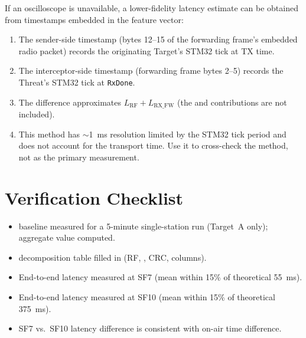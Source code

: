 \documentclass[11pt,letterpaper]{article}
\begin{document}
\begin{tcolorbox}[infobox={Timestamp Difference Method (Alternative)}]
	If an oscilloscope is unavailable, a lower-fidelity latency estimate can be obtained from timestamps embedded in the feature vector:
	\begin{enumerate}[leftmargin=1.2em]
		\item The sender-side timestamp (bytes 12--15 of the forwarding frame's embedded radio packet) records the originating Target's STM32 tick at TX time.
		\item The interceptor-side timestamp (forwarding frame bytes 2--5) records the Threat's STM32 tick at \texttt{RxDone}.
		\item The difference approximates $L_{\text{RF}} + L_{\text{RX\_FW}}$ (the \UART{} and \FPGA{} contributions are not included).
		\item This method has $\sim$1~ms resolution limited by the STM32 tick period and does not account for the \UART{} transport time. Use it to cross-check the \GPIO{} method, not as the primary measurement.
	\end{enumerate}
\end{tcolorbox}

\section{Verification Checklist}
\begin{itemize}[leftmargin=2em]
	\item[$\square$] \PER{} baseline measured for a 5-minute single-station run (Target~A only); aggregate value computed.
	\item[$\square$] \PER{} decomposition table filled in (RF, \UART{}, \mbox{CRC}, \FIFO{} columns).
	\item[$\square$] End-to-end latency measured at SF7 (mean within 15\% of theoretical 55~ms).
	\item[$\square$] End-to-end latency measured at SF10 (mean within 15\% of theoretical 375~ms).
	\item[$\square$] SF7 vs.\ SF10 latency difference is consistent with \RF{} on-air time difference.
\end{itemize}
\end{document}
